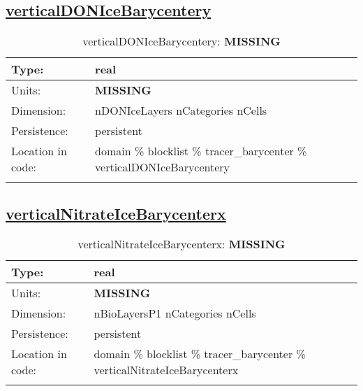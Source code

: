 \subsection[verticalDONIceBarycentery]{\hyperref[sec:var_tab_tracer_barycenter]{verticalDONIceBarycentery}}
\label{subsec:var_sec_tracer_barycenter_verticalDONIceBarycentery}
\begin{center}
\begin{longtable}{| p{2.0in} | p{4.0in} |}
        \hline 
        Type: & real \\
        \hline 
        Units: & {\bf \color{red} MISSING} \\
        \hline 
        Dimension: & nDONIceLayers nCategories nCells \\
        \hline 
        Persistence: & persistent \\
        \hline 
         Location in code: & domain \% blocklist \% tracer\_barycenter \% verticalDONIceBarycentery \\
         \hline 
    \caption{verticalDONIceBarycentery: {\bf \color{red} MISSING}}
\end{longtable}
\end{center}
\subsection[verticalNitrateIceBarycenterx]{\hyperref[sec:var_tab_tracer_barycenter]{verticalNitrateIceBarycenterx}}
\label{subsec:var_sec_tracer_barycenter_verticalNitrateIceBarycenterx}
\begin{center}
\begin{longtable}{| p{2.0in} | p{4.0in} |}
        \hline 
        Type: & real \\
        \hline 
        Units: & {\bf \color{red} MISSING} \\
        \hline 
        Dimension: & nBioLayersP1 nCategories nCells \\
        \hline 
        Persistence: & persistent \\
        \hline 
         Location in code: & domain \% blocklist \% tracer\_barycenter \% verticalNitrateIceBarycenterx \\
         \hline 
    \caption{verticalNitrateIceBarycenterx: {\bf \color{red} MISSING}}
\end{longtable}
\end{center}
